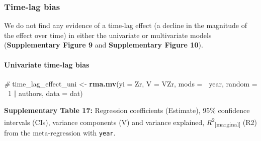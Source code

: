 \documentclass[
]{article}
\newenvironment{Shaded}{\begin{snugshade}}{\end{snugshade}}
\newcommand{\CommentTok}[1]{\textcolor[rgb]{0.56,0.35,0.01}{\textit{#1}}}
\newcommand{\DataTypeTok}[1]{\textcolor[rgb]{0.13,0.29,0.53}{#1}}
\newcommand{\DecValTok}[1]{\textcolor[rgb]{0.00,0.00,0.81}{#1}}
\newcommand{\KeywordTok}[1]{\textcolor[rgb]{0.13,0.29,0.53}{\textbf{#1}}}
\newcommand{\NormalTok}[1]{#1}
\newcommand{\OperatorTok}[1]{\textcolor[rgb]{0.81,0.36,0.00}{\textbf{#1}}}
\newcommand{\StringTok}[1]{\textcolor[rgb]{0.31,0.60,0.02}{#1}}
\begin{document}
\hypertarget{time-lag-bias}{%
\subsubsection{Time-lag bias}\label{time-lag-bias}}

We do not find any evidence of a time-lag effect (a decline in the
magnitude of the effect over time) in either the univariate or
multivariate models (\textbf{Supplementary Figure 9} and
\textbf{Supplementary Figure 10}).

\hypertarget{univariate-time-lag-bias}{%
\paragraph{Univariate time-lag bias}\label{univariate-time-lag-bias}}

\begin{Shaded}
\begin{Highlighting}[]
\CommentTok{# }
\NormalTok{time_lag_effect_uni <-}\StringTok{ }\KeywordTok{rma.mv}\NormalTok{(}\DataTypeTok{yi =}\NormalTok{ Zr, }\DataTypeTok{V =}\NormalTok{ VZr, }\DataTypeTok{mods =} \OperatorTok{~}\NormalTok{year, }\DataTypeTok{random =} \OperatorTok{~}\DecValTok{1} \OperatorTok{|}\StringTok{ }\NormalTok{authors, }
    \DataTypeTok{data =}\NormalTok{ dat)}
\end{Highlighting}
\end{Shaded}

\textbf{Supplementary Table 17:} Regression coefficients (Estimate),
95\% confidence intervals (CIs), variance components (V) and variance
explained, \emph{R}\textsuperscript{2}\textsubscript{{[}marginal{]}}
(R2) from the meta-regression with \texttt{year}.
\end{document}
